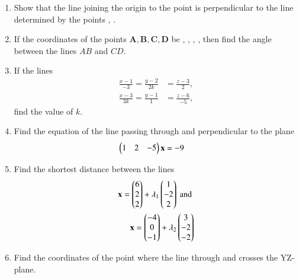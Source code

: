 \begin{enumerate}[label=\arabic*.,ref=\thesubsection.\theenumi]
\begin{table}[!h]

\caption{}
\label{table:3d}
\end{table}
%
\item Show that the line joining the origin to the point  is perpendicular to the line determined by the points , .
\item If the coordinates of the points $\bm{A}, \bm{B}, \bm{C}, \bm{D}$ be , , , , then find the angle between the lines $AB$ and $CD$.  
%
\item If the lines 
\begin{align}
\frac{x-1}{-3} = \frac{y-2}{2k} &= \frac{z-3}{2}, 
\\
\frac{x-3}{3k} = \frac{y-1}{1} &= \frac{z-6}{-5} ,
\end{align}
find the value of $k$.
\item Find the  equation of the line passing through  and perpendicular to the plane %
\begin{align}
\begin{pmatrix}1 & 2 & -5\end{pmatrix}\mathbf{x}&=-9
\end{align}
\item Find the shortest distance between the lines 
%
\begin{align}
\mathbf{x} = \begin{pmatrix}6 \\ 2 \\ 2\end{pmatrix} + \lambda_1 \begin{pmatrix}1 \\ -2 \\ 2\end{pmatrix}  \text{ and }
\\
\mathbf{x} = \begin{pmatrix}-4 \\ 0 \\ -1\end{pmatrix} + \lambda_2 \begin{pmatrix}3 \\ -2 \\ -2\end{pmatrix}  
\end{align}
%
\item Find the coordinates of the point where the line through  and  crosses the YZ-plane.

\end{enumerate}
